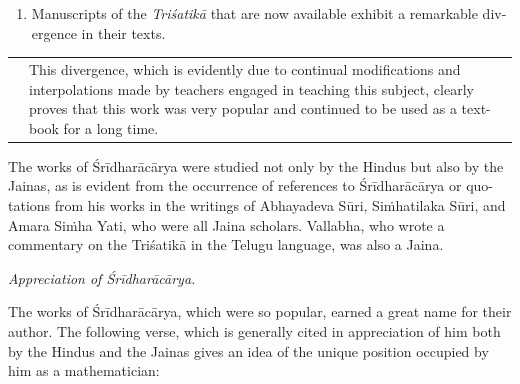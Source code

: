 \documentclass[10pt, openany]{book}
\begin{document}
\begin{enumerate}
\begin{enumerate}[(i)]
    \item An anonymous commentary in Gujarātī.~~~~\renewcommand{\thefootnote}{\hspace{-4.5mm} 6}\footnote{\hspace{-2mm} \englishfont A manuscript of this commentary exists in the Oriental Institute, 
Baroda, Accession No. 4660. Some extracts from this manuscript have 
been quoted by Bhogilal J. Sandesara in his paper, entitled 'Weights, 
Measures and Coinage of Medieval Gujrat.' See \textit{Journal of the Numismatic Society of India}, Vol. VIII, Part II, 1946, pp. 138-146.}
\end{enumerate}

{It is noteworthy that the last-mentioned three}
{commentaries were written in the regional languages}
{of India. This is another evidence of the}
{great popularity of this work.}

\item{Manuscripts of the \textit{Triśatikā} that are now available}
{exhibit a remarkable div-ergence in their texts.}
\end{enumerate}

\newpage

\hspace{-4mm} \begin{tabular}{p{} p{}}
 & {This divergence, which is evidently due to continual}
{modifications and interpolations made by teachers}
{engaged in teaching this subject, clearly proves that}
{this work was very popular and continued to be}
{used as a text-book for a long time.}
\end{tabular}
\vspace{2mm}

{The works of Śrīdharācārya were studied not only by} 
{the Hindus but also by the Jainas, as is evident from the}
{occurrence of references to Śrīdharācārya or quo-tations from}
{his works in the writings of Abhayadeva Sūri, Siṁhatilaka}
{Sūri, and Amara Siṁha Yati, who were all Jaina scholars.}
{Vallabha, who wrote a commentary on the Triśatikā in the Telugu language, was also a Jaina.}
\vspace{3mm}

\textit{Appreciation of Śrīdharācārya.}
\vspace{3mm}

{The works of Śrīdharācārya, which were so popular,} 
{earned a great name for their author. The following verse,}
{which is generally cited in appreciation of him both by the}
{Hindus and the Jainas gives an idea of the unique position}
{occupied by him as a mathematician:}
\end{document}

